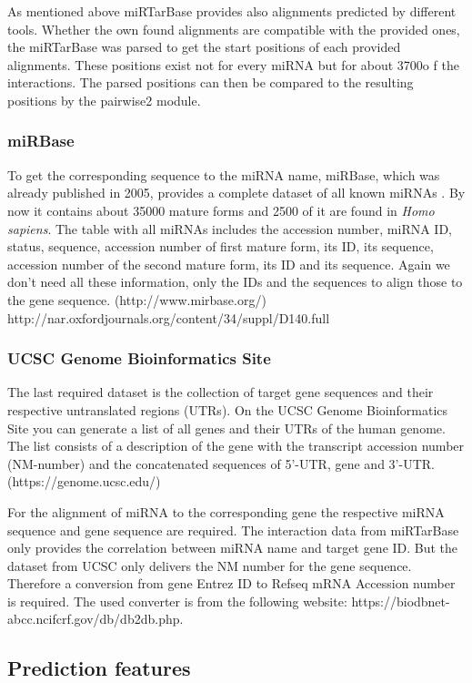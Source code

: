 \documentclass[12pt]{article}
\begin{document}
As mentioned above miRTarBase provides also alignments predicted by different tools. Whether the own found alignments are compatible with the provided ones, the miRTarBase was parsed to get the start positions of each provided alignments. These positions exist not for every miRNA but for about 3700o f the interactions. The parsed positions can then be compared to the resulting positions by the pairwise2 module. 

\subsubsection{miRBase}
To get the corresponding sequence to the miRNA name, miRBase, which was already published in 2005, provides a complete dataset of all known miRNAs \cite{Griffiths-Jones}. By now it contains about 35000 mature forms and 2500 of it are found in \textit{Homo sapiens}. The table with all miRNAs includes the accession number, miRNA ID, status, sequence, accession number of first mature form, its ID, its sequence, accession number of the second mature form, its ID and its sequence. Again we don't need all these information, only the IDs and the sequences to align those to the gene sequence. (http://www.mirbase.org/) http://nar.oxfordjournals.org/content/34/suppl/D140.full 

\subsubsection{UCSC Genome Bioinformatics Site}
The last required dataset is the collection of target gene sequences and their respective untranslated regions (UTRs). On the UCSC Genome Bioinformatics Site you can generate a list of all genes and their UTRs of the human genome. The list consists of a description of the gene with the transcript accession number (NM-number) and the concatenated sequences of 5'-UTR, gene and 3'-UTR. (https://genome.ucsc.edu/) 

For the alignment of miRNA to the corresponding gene the respective miRNA sequence and gene sequence are required. The interaction data from miRTarBase only provides the correlation between miRNA name and target gene ID. But the dataset from UCSC only delivers the NM number for the gene sequence. Therefore a conversion from gene Entrez ID to Refseq mRNA Accession number is required. The used converter is from the following website: https://biodbnet-abcc.ncifcrf.gov/db/db2db.php.
 

\subsection{Prediction features}
\end{document}
